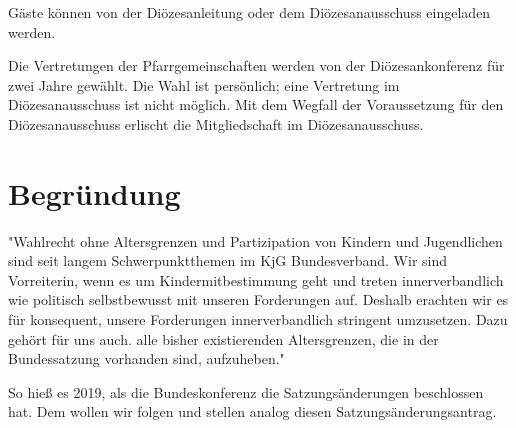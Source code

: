 \documentclass[12pt]{report}
\begin{document}
\begin{flushleft}
Gäste können von der Diözesanleitung oder dem Diözesanausschuss eingeladen werden.

Die Vertretungen der Pfarrgemeinschaften werden von der Diözesankonferenz für zwei Jahre
gewählt. Die Wahl ist persönlich; eine Vertretung im Diözesanausschuss ist nicht möglich. Mit
dem Wegfall der Voraussetzung für den Diözesanausschuss erlischt die Mitgliedschaft im Diözesanausschuss.

\section*{Begründung}

"Wahlrecht ohne Altersgrenzen und Partizipation von Kindern und Jugendlichen
sind seit langem Schwerpunktthemen im KjG Bundesverband. Wir sind Vorreiterin,
wenn es um Kindermitbestimmung geht und treten innerverbandlich wie politisch selbstbewusst mit unseren Forderungen auf.
Deshalb erachten wir es für konsequent, unsere Forderungen innerverbandlich stringent umzusetzen.
Dazu gehört für uns auch. alle bisher existierenden Altersgrenzen, die in der Bundessatzung vorhanden sind,
aufzuheben."

So hieß es 2019, als die Bundeskonferenz die Satzungsänderungen beschlossen hat.
Dem wollen wir folgen und stellen analog diesen Satzungsänderungsantrag.

\end{flushleft}
\end{document}
